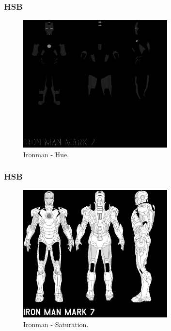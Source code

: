 \documentclass{beamer}
\begin{document}
\begin{frame}
\frametitle{HSB}
		
		\begin{figure}[!h]
			\begin{center}
				\includegraphics[width=0.7\textwidth]{Figures/Hue}
				\caption{Ironman - Hue.}
			\end{center}
		\end{figure}
	
\end{frame}

\begin{frame}
\frametitle{HSB}
		
		\begin{figure}[!h]
			\begin{center}
				\includegraphics[width=0.7\textwidth]{Figures/Saturation}
				\caption{Ironman - Saturation.}
			\end{center}
		\end{figure}
\end{frame}
\end{document}
